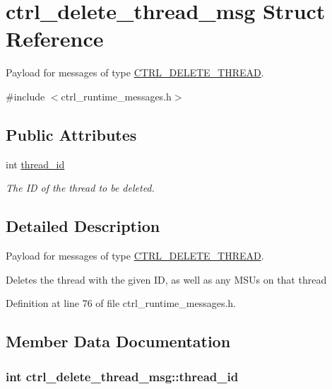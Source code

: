 \hypertarget{structctrl__delete__thread__msg}{\section{ctrl\-\_\-delete\-\_\-thread\-\_\-msg Struct Reference}
\label{structctrl__delete__thread__msg}
}


Payload for messages of type \hyperlink{ctrl__runtime__messages_8h_aff250b7918a6975b13277c84bc6ec5b9a3c0e4be670ba69db1375758d3c8a4f33}{C\-T\-R\-L\-\_\-\-D\-E\-L\-E\-T\-E\-\_\-\-T\-H\-R\-E\-A\-D}.  




{\ttfamily \#include $<$ctrl\-\_\-runtime\-\_\-messages.\-h$>$}

\subsection*{Public Attributes}
\begin{DoxyCompactItemize}
\item 
int \hyperlink{structctrl__delete__thread__msg_ad841782f8371b4fb3cb72e8c02fc1366}{thread\-\_\-id}
\begin{DoxyCompactList}\small\item\em The I\-D of the thread to be deleted. \end{DoxyCompactList}\end{DoxyCompactItemize}


\subsection{Detailed Description}
Payload for messages of type \hyperlink{ctrl__runtime__messages_8h_aff250b7918a6975b13277c84bc6ec5b9a3c0e4be670ba69db1375758d3c8a4f33}{C\-T\-R\-L\-\_\-\-D\-E\-L\-E\-T\-E\-\_\-\-T\-H\-R\-E\-A\-D}. 

Deletes the thread with the given I\-D, as well as any M\-S\-Us on that thread 

Definition at line 76 of file ctrl\-\_\-runtime\-\_\-messages.\-h.



\subsection{Member Data Documentation}
\hypertarget{structctrl__delete__thread__msg_ad841782f8371b4fb3cb72e8c02fc1366}{
\subsubsection[{thread\-\_\-id}]{\setlength{\rightskip}{0pt plus 5cm}int ctrl\-\_\-delete\-\_\-thread\-\_\-msg\-::thread\-\_\-id}}\label{structctrl__delete__thread__msg_ad841782f8371b4fb3cb72e8c02fc1366}


